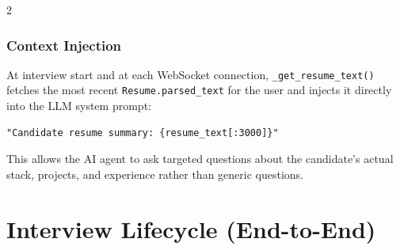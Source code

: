 \documentclass[10pt, a4paper]{article}
\begin{document}
\begin{multicols}{2}
\subsubsection{Context Injection}
At interview start and at each WebSocket connection, \texttt{\_get\_resume\_text()}
fetches the most recent \texttt{Resume.parsed\_text} for the user and
injects it directly into the LLM system prompt:

\begin{codebox}
\footnotesize
\begin{verbatim}
"Candidate resume summary: {resume_text[:3000]}"
\end{verbatim}
\end{codebox}

This allows the AI agent to ask targeted questions about the candidate's
actual stack, projects, and experience rather than generic questions.

\section{Interview Lifecycle (End-to-End)}


\end{multicols}
\end{document}
